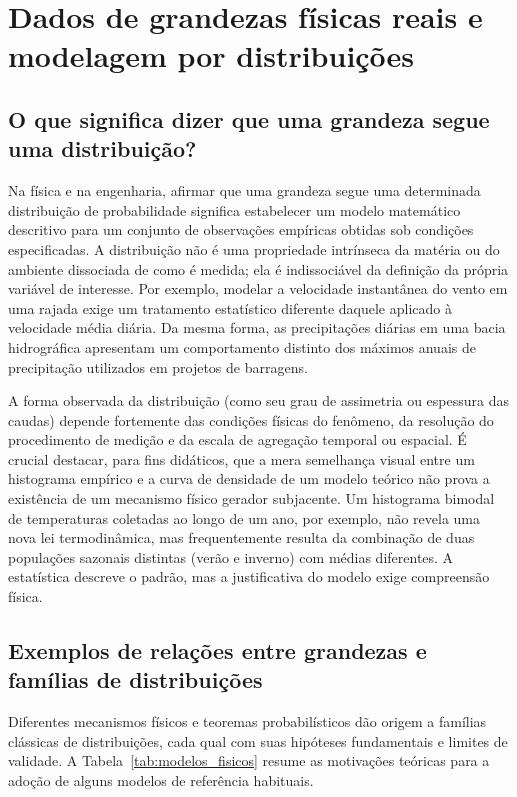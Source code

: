 \section{Dados de grandezas físicas reais e modelagem por distribuições}\label{sec:dados}

\subsection{O que significa dizer que uma grandeza segue uma distribuição?}

Na física e na engenharia, afirmar que uma grandeza segue uma determinada distribuição de probabilidade significa estabelecer um modelo matemático descritivo para um conjunto de observações empíricas obtidas sob condições especificadas. A distribuição não é uma propriedade intrínseca da matéria ou do ambiente dissociada de como é medida; ela é indissociável da definição da própria variável de interesse. Por exemplo, modelar a velocidade instantânea do vento em uma rajada exige um tratamento estatístico diferente daquele aplicado à velocidade média diária. Da mesma forma, as precipitações diárias em uma bacia hidrográfica apresentam um comportamento distinto dos máximos anuais de precipitação utilizados em projetos de barragens.

A forma observada da distribuição (como seu grau de assimetria ou espessura das caudas) depende fortemente das condições físicas do fenômeno, da resolução do procedimento de medição e da escala de agregação temporal ou espacial. É crucial destacar, para fins didáticos, que a mera semelhança visual entre um histograma empírico e a curva de densidade de um modelo teórico não prova a existência de um mecanismo físico gerador subjacente. Um histograma bimodal de temperaturas coletadas ao longo de um ano, por exemplo, não revela uma nova lei termodinâmica, mas frequentemente resulta da combinação de duas populações sazonais distintas (verão e inverno) com médias diferentes. A estatística descreve o padrão, mas a justificativa do modelo exige compreensão física.

\subsection{Exemplos de relações entre grandezas e famílias de distribuições}

Diferentes mecanismos físicos e teoremas probabilísticos dão origem a famílias clássicas de distribuições, cada qual com suas hipóteses fundamentais e limites de validade. A Tabela~\ref{tab:modelos_fisicos} resume as motivações teóricas para a adoção de alguns modelos de referência habituais.

